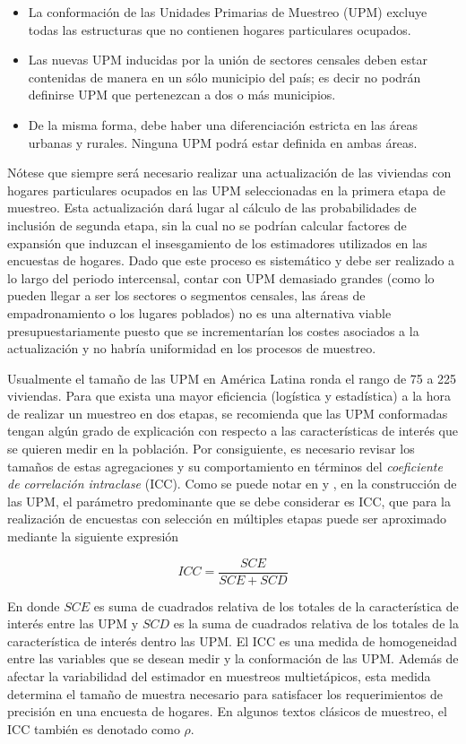\documentclass[
  12pt,
  spanish,
]{book}
\providecommand{\tightlist}{%
  \setlength{\itemsep}{0pt}\setlength{\parskip}{0pt}}
\begin{document}
\begin{itemize}
\tightlist
\item
  La conformación de las Unidades Primarias de Muestreo (UPM) excluye todas las estructuras que no contienen hogares particulares ocupados.
\item
  Las nuevas UPM inducidas por la unión de sectores censales deben estar contenidas de manera en un sólo municipio del país; es decir no podrán definirse UPM que pertenezcan a dos o más municipios.
\item
  De la misma forma, debe haber una diferenciación estricta en las áreas urbanas y rurales. Ninguna UPM podrá estar definida en ambas áreas.
\end{itemize}

Nótese que siempre será necesario realizar una actualización de las viviendas con hogares particulares ocupados en las UPM seleccionadas en la primera etapa de muestreo. Esta actualización dará lugar al cálculo de las probabilidades de inclusión de segunda etapa, sin la cual no se podrían calcular factores de expansión que induzcan el insesgamiento de los estimadores utilizados en las encuestas de hogares. Dado que este proceso es sistemático y debe ser realizado a lo largo del periodo intercensal, contar con UPM demasiado grandes (como lo pueden llegar a ser los sectores o segmentos censales, las áreas de empadronamiento o los lugares poblados) no es una alternativa viable presupuestariamente puesto que se incrementarían los costes asociados a la actualización y no habría uniformidad en los procesos de muestreo.

Usualmente el tamaño de las UPM en América Latina ronda el rango de 75 a 225 viviendas. Para que exista una mayor eficiencia (logística y estadística) a la hora de realizar un muestreo en dos etapas, se recomienda que las UPM conformadas tengan algún grado de explicación con respecto a las características de interés que se quieren medir en la población. Por consiguiente, es necesario revisar los tamaños de estas agregaciones y su comportamiento en términos del \emph{coeficiente de correlación intraclase} (ICC). Como se puede notar en \citet{Cochran_1977} y \citet{Gutierrez_2016}, en la construcción de las UPM, el parámetro predominante que se debe considerar es ICC, que para la realización de encuestas con selección en múltiples etapas puede ser aproximado mediante la siguiente expresión \citep{Valliant_Dever_Kreuter_2013}

\[
ICC = \frac{SCE}{SCE+SCD}
\]

En donde \(SCE\) es suma de cuadrados relativa de los totales de la característica de interés entre las UPM y \(SCD\) es la suma de cuadrados relativa de los totales de la característica de interés dentro las UPM. El ICC es una medida de homogeneidad entre las variables que se desean medir y la conformación de las UPM. Además de afectar la variabilidad del estimador en muestreos multietápicos, esta medida determina el tamaño de muestra necesario para satisfacer los requerimientos de precisión en una encuesta de hogares. En algunos textos clásicos de muestreo, el ICC también es denotado como \(\rho\).
\end{document}

